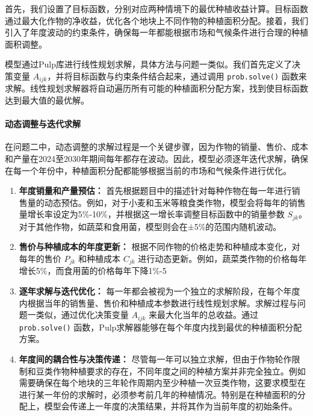 \documentclass[12pt,a4paper]{nmmcm}
\begin{document}
首先，我们设置了目标函数，分别对应两种情境下的最优种植收益计算。目标函数通过最大化作物的净收益，优化各个地块上不同作物的种植面积分配。接着，我们引入了年度波动的约束条件，确保每一年都能根据市场和气候条件进行合理的种植面积调整。

模型通过Pulp库进行线性规划求解，具体方法与问题一类似。我们首先定义了决策变量 $A_{ijk}$，并将目标函数与约束条件结合起来，通过调用 \texttt{prob.solve()} 函数来求解。线性规划求解器将自动遍历所有可能的种植面积分配方案，找到使目标函数达到最大值的最优解。

\paragraph{动态调整与迭代求解}

在问题二中，动态调整的求解过程是一个关键步骤，因为作物的销量、售价、成本和产量在2024至2030年期间每年都存在波动。因此，模型必须逐年迭代求解，确保在每一个年份中，种植面积分配都能够根据当前的市场和气候条件进行优化。

\begin{enumerate}
  \item \textbf{年度销量和产量预估：} 首先根据题目中的描述针对每种作物在每一年进行销售量的动态预估。例如，对于小麦和玉米等粮食类作物，模型会将每年的销售量增长率设定为5\%-10\%，并根据这一增长率调整目标函数中的销量参数 $S_{jk}$。对于其他作物，如蔬菜和食用菌，模型则会在±5\%的范围内随机波动。

  \item \textbf{售价与种植成本的年度更新：} 根据不同作物的价格走势和种植成本变化，对每年的售价 $P_{jk}$ 和种植成本 $C_{jk}$ 进行动态更新。例如，蔬菜类作物的价格每年增长5\%，而食用菌的价格每年下降1\%-5%

  \item \textbf{逐年求解与迭代优化：} 每一年都会被视为一个独立的求解阶段，在每个年度内根据当年的销售量、售价和种植成本参数进行线性规划求解。求解过程与问题一类似，通过优化决策变量 $A_{ijk}$ 来最大化当年的总收益。通过 \texttt{prob.solve()} 函数，Pulp求解器能够在每个年度内找到最优的种植面积分配方案。

  \item \textbf{年度间的耦合性与决策传递：} 尽管每一年可以独立求解，但由于作物轮作限制和豆类作物种植要求的存在，不同年度之间的种植方案并非完全独立。例如需要确保在每个地块的三年轮作周期内至少种植一次豆类作物，这要求模型在进行某一年份的求解时，必须参考前几年的种植情况。特别是在种植面积的分配上，模型会传递上一年度的决策结果，并将其作为当前年度的初始条件。
\end{enumerate}
\end{document}

